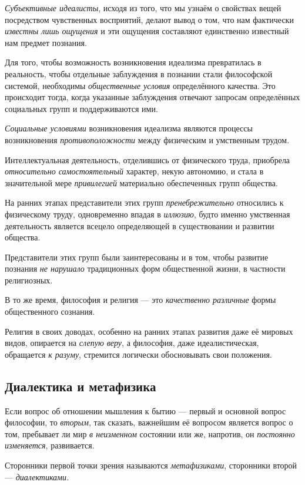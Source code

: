 \documentclass[a4paper,14pt,russian]{extreport}
\begin{document}
\emph{Субъективные идеалисты}, исходя из того, что мы узнаём о свойствах вещей посредством чувственных восприятий, делают вывод о том, что нам фактически \emph{известны лишь ощущения} и эти ощущения составляют единственно известный нам предмет познания.

Для того, чтобы возможность возникновения идеализма превратилась в реальность, чтобы отдельные заблуждения в познании стали философской системой, необходимы \emph{общественные условия} определённого качества. Это происходит тогда, когда указанные заблуждения отвечают запросам определённых социальных групп и поддерживаются ими.

\emph{Социальные условиями} возникновения идеализма являются процессы возникновения \emph{противоположности} между физическим и умственным трудом.

Интеллектуальная деятельность, отделившись от физического труда, приобрела \emph{относительно самостоятельный} характер, некую автономию, и стала в значительной мере \emph{привилегией} материально обеспеченных групп общества.

На ранних этапах представители этих групп \emph{пренебрежительно} относились к физическому труду, одновременно впадая в \emph{иллюзию}, будто именно умственная деятельность является всецело определяющей в существовании и развитии общества.

Представители этих групп были заинтересованы и в том, чтобы развитие познания \emph{не нарушало} традиционных форм общественной жизни, в частности религиозных.

В то же время, философия и религия --- это \emph{качественно различные} формы общественного сознания.

Религия в своих доводах, особенно на ранних этапах развития даже её мировых видов, опирается на \emph{слепую веру}, а философия, даже идеалистическая, обращается \emph{к разуму}, стремится логически обосновывать свои положения.

\subsection{Диалектика и метафизика}

Если вопрос об отношении мышления к бытию --- первый и основной вопрос философии, то \emph{вторым}, так сказать, важнейшим её вопросом является вопрос о том, пребывает ли мир \emph{в неизменном} состоянии или же, напротив, он \emph{постоянно изменяется}, развивается.

Сторонники первой точки зрения называются \emph{метафизиками}, сторонники второй --- \emph{диалектиками.}
\end{document}
